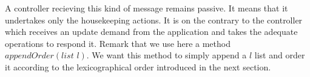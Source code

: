 \documentclass{article}
\begin{document}
A controller recieving this kind of message remains passive. It means that it undertakes only the housekeeping actions. It is on the contrary to the controller which receives an update demand from the application and takes the adequate operations to respond it.
Remark that we use here a method $appendOrder(\textit{list } l)$. We want this method to simply append a $l$ list and order it according to the lexicographical order introduced in the next section.
%

%
\end{document}
